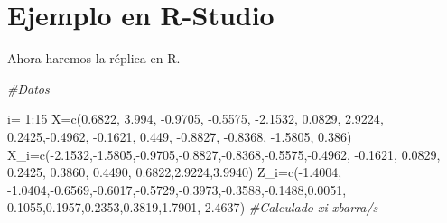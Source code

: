 \documentclass[
  a4paper,
  oneside,
  openany]{book}
\newenvironment{Shaded}{\begin{snugshade}}{\end{snugshade}}
\newcommand{\CommentTok}[1]{\textcolor[rgb]{0.56,0.35,0.01}{\textit{#1}}}
\newcommand{\DecValTok}[1]{\textcolor[rgb]{0.00,0.00,0.81}{#1}}
\newcommand{\FloatTok}[1]{\textcolor[rgb]{0.00,0.00,0.81}{#1}}
\newcommand{\FunctionTok}[1]{\textcolor[rgb]{0.00,0.00,0.00}{#1}}
\newcommand{\NormalTok}[1]{#1}
\newcommand{\OtherTok}[1]{\textcolor[rgb]{0.56,0.35,0.01}{#1}}
\newcommand{\SpecialCharTok}[1]{\textcolor[rgb]{0.00,0.00,0.00}{#1}}
\begin{document}
\hypertarget{ejemplo-en-r-studio-15}{%
\section{Ejemplo en R-Studio}\label{ejemplo-en-r-studio-15}}

Ahora haremos la réplica en R.

\begin{Shaded}
\begin{Highlighting}[]
\CommentTok{\#Datos}

\NormalTok{i}\OtherTok{=} \DecValTok{1}\SpecialCharTok{:}\DecValTok{15}
\NormalTok{X}\OtherTok{=}\FunctionTok{c}\NormalTok{(}\FloatTok{0.6822}\NormalTok{, }\FloatTok{3.994}\NormalTok{, }\SpecialCharTok{{-}}\FloatTok{0.9705}\NormalTok{, }\SpecialCharTok{{-}}\FloatTok{0.5575}\NormalTok{, }\SpecialCharTok{{-}}\FloatTok{2.1532}\NormalTok{, }\FloatTok{0.0829}\NormalTok{, }\FloatTok{2.9224}\NormalTok{,}
    \FloatTok{0.2425}\NormalTok{,}\SpecialCharTok{{-}}\FloatTok{0.4962}\NormalTok{, }\SpecialCharTok{{-}}\FloatTok{0.1621}\NormalTok{, }\FloatTok{0.449}\NormalTok{, }\SpecialCharTok{{-}}\FloatTok{0.8827}\NormalTok{, }\SpecialCharTok{{-}}\FloatTok{0.8368}\NormalTok{, }\SpecialCharTok{{-}}\FloatTok{1.5805}\NormalTok{, }\FloatTok{0.386}\NormalTok{)}
\NormalTok{X\_i}\OtherTok{=}\FunctionTok{c}\NormalTok{(}\SpecialCharTok{{-}}\FloatTok{2.1532}\NormalTok{,}\SpecialCharTok{{-}}\FloatTok{1.5805}\NormalTok{,}\SpecialCharTok{{-}}\FloatTok{0.9705}\NormalTok{,}\SpecialCharTok{{-}}\FloatTok{0.8827}\NormalTok{,}\SpecialCharTok{{-}}\FloatTok{0.8368}\NormalTok{,}\SpecialCharTok{{-}}\FloatTok{0.5575}\NormalTok{,}\SpecialCharTok{{-}}\FloatTok{0.4962}\NormalTok{, }\SpecialCharTok{{-}}\FloatTok{0.1621}\NormalTok{,  }\FloatTok{0.0829}\NormalTok{,  }\FloatTok{0.2425}\NormalTok{,}
      \FloatTok{0.3860}\NormalTok{, }\FloatTok{0.4490}\NormalTok{,  }\FloatTok{0.6822}\NormalTok{,}\FloatTok{2.9224}\NormalTok{,}\FloatTok{3.9940}\NormalTok{)}
\NormalTok{Z\_i}\OtherTok{=}\FunctionTok{c}\NormalTok{(}\SpecialCharTok{{-}}\FloatTok{1.4004}\NormalTok{, }\SpecialCharTok{{-}}\FloatTok{1.0404}\NormalTok{,}\SpecialCharTok{{-}}\FloatTok{0.6569}\NormalTok{,}\SpecialCharTok{{-}}\FloatTok{0.6017}\NormalTok{,}\SpecialCharTok{{-}}\FloatTok{0.5729}\NormalTok{,}\SpecialCharTok{{-}}\FloatTok{0.3973}\NormalTok{,}\SpecialCharTok{{-}}\FloatTok{0.3588}\NormalTok{,}\SpecialCharTok{{-}}\FloatTok{0.1488}\NormalTok{,}\FloatTok{0.0051}\NormalTok{,}
\FloatTok{0.1055}\NormalTok{,}\FloatTok{0.1957}\NormalTok{,}\FloatTok{0.2353}\NormalTok{,}\FloatTok{0.3819}\NormalTok{,}\FloatTok{1.7901}\NormalTok{,  }\FloatTok{2.4637}\NormalTok{) }\CommentTok{\#Calculado xi{-}xbarra/s}

\end{Highlighting}
\end{Shaded}
\end{document}
